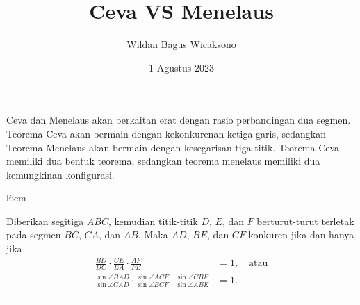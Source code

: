 \documentclass[a4paper, 11pt]{article}
\title{\textbf{Ceva VS Menelaus}}
\author{Wildan Bagus Wicaksono}
\date{1 Agustus 2023}
\begin{document}
\maketitle

Ceva dan Menelaus akan berkaitan erat dengan rasio perbandingan dua segmen. Teorema Ceva akan bermain dengan kekonkurenan ketiga garis, sedangkan Teorema Menelaus akan bermain dengan kesegarisan tiga titik. Teorema Ceva memiliki dua bentuk teorema, sedangkan teorema menelaus memiliki dua kemungkinan konfigurasi.
\begin{tcolorbox}[colback=green!5!white,colframe=ForestGreen!75!black,title=\textbf{Teorema 1: Ceva}]
\begin{wrapfigure}{l}{6cm}
\end{wrapfigure}
Diberikan segitiga $ABC$, kemudian titik-titik $D$, $E$, dan $F$ berturut-turut terletak pada segmen $BC$, $CA$, dan $AB$. 
Maka $AD$, $BE$, dan $CF$ konkuren jika dan hanya jika
\begin{align*}
\frac{BD}{DC}\cdot \frac{CE}{EA}\cdot \frac{AF}{FB} &= 1,\quad \text{atau}\\
\frac{\sin \angle BAD}{\sin \angle CAD}\cdot \frac{\sin \angle ACF}{\sin \angle BCF}\cdot \frac{\sin \angle CBE}{\sin \angle ABE} &= 1.
\end{align*}
\textcolor{white}{......................................................................................}
\end{tcolorbox}
\end{document}
